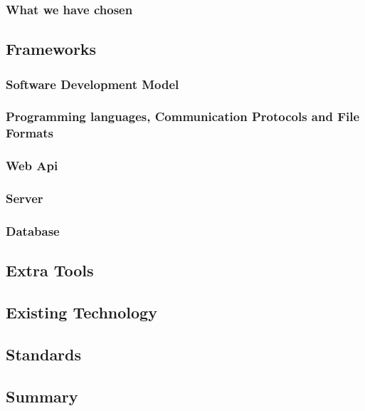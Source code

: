 \subsubsection{What we have chosen}
\subsection{Frameworks}
\subsubsection{Software Development Model}
\subsubsection{Programming languages, Communication Protocols and File Formats}
\subsubsection{Web Api}
\subsubsection{Server}
\subsubsection{Database}
\subsection{Extra Tools}
\subsection{Existing Technology}

\subsection{Standards}

\subsection{Summary}